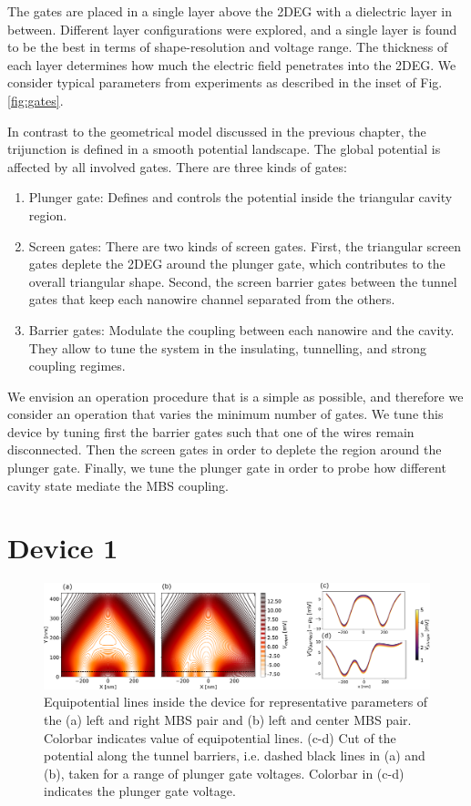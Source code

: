 The gates are placed in a single layer above the 2DEG with a dielectric layer in between.
Different layer configurations were explored, and a single layer is found to be the best in terms of shape-resolution and voltage range.
The thickness of each layer determines how much the electric field penetrates into the 2DEG.
We consider typical parameters from experiments as described in the inset of Fig. \ref{fig:gates}.

In contrast to the geometrical model discussed in the previous chapter, the trijunction is defined in a smooth potential landscape.
The global potential is affected by all involved gates.
There are three kinds of gates:
\begin{enumerate}
\item Plunger gate: Defines and controls the potential inside the triangular cavity region.
\item Screen gates: There are two kinds of screen gates. First, the triangular screen gates deplete the 2DEG around the plunger gate, which contributes to the overall triangular shape. Second, the screen barrier gates between the tunnel gates that keep each nanowire channel separated from the others.
\item Barrier gates: Modulate the coupling between each nanowire and the cavity. They allow to tune the system in the insulating, tunnelling, and strong coupling regimes.
\end{enumerate}

We envision an operation procedure that is a simple as possible, and therefore we consider an operation that varies the minimum number of gates.
We tune this device by tuning first the barrier gates such that one of the wires remain disconnected.
Then the screen gates in order to deplete the region around the plunger gate.
Finally, we tune the plunger gate in order to probe how different cavity state mediate the MBS coupling.

\section{Device 1}

\begin{figure}
\centering
  \includegraphics[width=\linewidth]{figures/device_1_potential.pdf}
  \caption{Equipotential lines inside the device for representative parameters of the (a) left and right MBS pair and (b) left and center MBS pair. Colorbar indicates value of equipotential lines. (c-d) Cut of the potential along the tunnel barriers, i.e. dashed black lines in (a) and (b), taken for a range of plunger gate voltages. Colorbar in (c-d) indicates the plunger gate voltage.}
  \label{fig:device_1_potential}
\end{figure}

